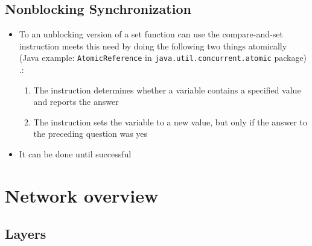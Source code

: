 \documentclass[11pt]{article}
\providecommand{\tightlist}{%
      \setlength{\itemsep}{0pt}\setlength{\parskip}{0pt}}
\begin{document}
    \subsection{Nonblocking
Synchronization}\label{nonblocking-synchronization}

\begin{itemize}
\tightlist
\item
  To an unblocking version of a set function can use the compare-and-set
  instruction meets this need by doing the following two things
  atomically (Java example: \texttt{AtomicReference} in
  \texttt{java.util.concurrent.atomic} package) .:

  \begin{enumerate}
  \def\labelenumi{\arabic{enumi}.}
  \tightlist
  \item
    The instruction determines whether a variable contains a specified
    value and reports the answer
  \item
    The instruction sets the variable to a new value, but only if the
    answer to the preceding question was yes
  \end{enumerate}
\item
  It can be done until successful
\end{itemize}

    \section{Network overview}\label{network-overview}

    \subsection{Layers}\label{layers}
\end{document}
